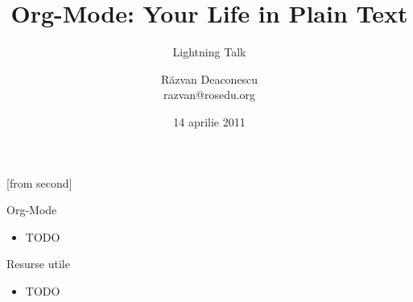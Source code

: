 \documentclass{beamer}
\title[Org-Mode]{Org-Mode: Your Life in Plain Text}
\subtitle{Lightning Talk}
\institute{Întâlnirile RLUG -- Aprilie 2011}
\author[Răzvan Deaconescu]{Răzvan Deaconescu\\
	razvan@rosedu.org}
\date{14 aprilie 2011}
\begin{document}
[from second]

\frame{\titlepage}

\begin{frame}{Org-Mode}
  \begin{itemize}
    \item TODO
  \end{itemize}
\end{frame}

\begin{frame}{Resurse utile}
	\begin{itemize}
		\item TODO
    \end{itemize}
\end{frame}
\end{document}
